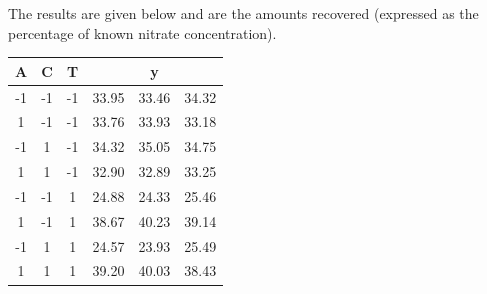 \documentclass[a4paper,12pt]{article}
\begin{document}
\noindent The results are given below and are the amounts recovered (expressed as the percentage of known nitrate concentration).
{
	\large
	\begin{center}
		\begin{tabular}{|c|c|c|ccc|}
			\hline
			\phantom{sp}A\phantom{sp}	&	\phantom{sp}C\phantom{sp}	&\phantom{sp}	T\phantom{sp}	&	& y	&	\\
			\hline
			-1	&	-1	&	-1	&	33.95 & 33.46 & 34.32 \\ \hline
			
			1	&	-1	&	-1	&	33.76 & 33.93 & 33.18 \\ \hline
			
			-1	&	1	&	-1	&	34.32 & 35.05 & 34.75 \\ \hline
			
			1	&	1	&	-1	&	32.90 & 32.89 & 33.25 \\ \hline
			
			-1	&	-1	&	1	&	24.88 & 24.33 & 25.46 \\ \hline
			
			1	&	-1	&	1	&	38.67 & 40.23 & 39.14 \\ \hline
			
			-1	&	1	&	1	&	24.57 & 23.93 & 25.49 \\ \hline						
			1	&	1	&	1	&	39.20 & 40.03 & 38.43 \\ \hline
		\end{tabular}
	\end{center}
}











\newpage
\end{document}
